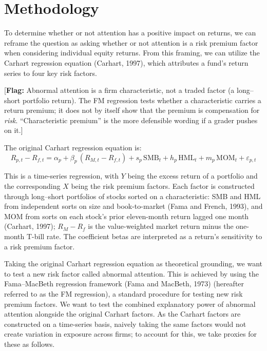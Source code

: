 \documentclass[11pt]{article}
\newcommand{\flag}[1]{{\color{red!75!black}\small [\textbf{Flag:} #1]}}
\newcommand{\filled}[1]{{\color{blue!70!black}#1}}   %
\begin{document}
\section*{Methodology}

To determine whether or not attention has a positive impact on returns, we can reframe the question as asking whether or not attention is a risk premium factor when considering individual equity returns. From this framing, we can utilize the Carhart regression equation \filled{(Carhart, 1997)}, which attributes a fund's return series to four key risk factors.

\flag{Abnormal attention is a firm characteristic, not a traded factor (a long--short portfolio return). The FM regression tests whether a characteristic carries a return premium; it does not by itself show that the premium is compensation for \emph{risk}. ``Characteristic premium'' is the more defensible wording if a grader pushes on it.}

The original Carhart regression equation is:
\begin{equation}
R_{p,t} - R_{f,t} = \alpha_p + \beta_p\,(R_{M,t} - R_{f,t}) + s_p\,\text{SMB}_t + h_p\,\text{HML}_t + m_p\,\text{MOM}_t + \varepsilon_{p,t}
\end{equation}

This is a time-series regression, with $Y$ being the excess return of a portfolio and the corresponding $X$ being the risk premium factors. Each factor is constructed through \filled{long--short portfolios of stocks sorted on a characteristic: SMB and HML from independent sorts on size and book-to-market (Fama and French, 1993), and MOM from sorts on each stock's prior eleven-month return lagged one month (Carhart, 1997); $R_M - R_f$ is the value-weighted market return minus the one-month T-bill rate}. The coefficient betas are interpreted as a return's sensitivity to a risk premium factor.

Taking the original Carhart regression equation as theoretical grounding, we want to test a new risk factor called abnormal attention. This is achieved by using the Fama--MacBeth regression framework \filled{(Fama and MacBeth, 1973)} (hereafter referred to as the FM regression), a standard procedure for testing new risk premium factors. We want to test the combined explanatory power of abnormal attention alongside the original Carhart factors. As the Carhart factors are constructed on a time-series basis, naively taking the same factors would not create variation in exposure across firms; to account for this, we take proxies for these as follows.
\end{document}
